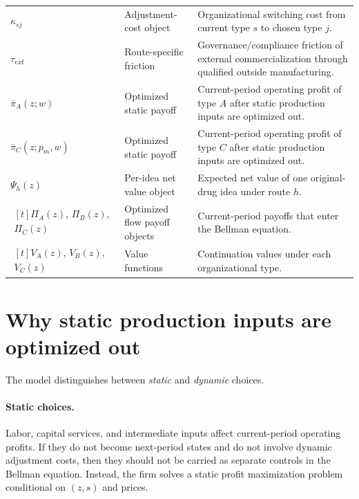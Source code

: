 \documentclass[12pt]{article}
\begin{document}
\begin{table}[htbp]
\begin{tabular}{@{}P{0.22\textwidth}P{0.20\textwidth}P{0.54\textwidth}@{}}
$\kappa_{sj}$ & Adjustment-cost object & Organizational switching cost from current type $s$ to chosen type $j$. \\[0.45em]

$\tau_{ext}$ & Route-specific friction & Governance/compliance friction of external commercialization through qualified outside manufacturing. \\[0.45em]

$\bar{\pi}_A(z;w)$ & Optimized static payoff & Current-period operating profit of type $A$ after static production inputs are optimized out. \\[0.45em]

$\bar{\pi}_C(z;p_m,w)$ & Optimized static payoff & Current-period operating profit of type $C$ after static production inputs are optimized out. \\[0.45em]

$\Psi_h(z)$ & Per-idea net value object & Expected net value of one original-drug idea under route $h$. \\[0.45em]

$\begin{aligned}[t]
\Pi_A(z),\,\Pi_B(z),\\
\Pi_C(z)
\end{aligned}$ & Optimized flow payoff objects & Current-period payoffs that enter the Bellman equation. \\[0.45em]

$\begin{aligned}[t]
V_A(z),\,V_B(z),\\
V_C(z)
\end{aligned}$ & Value functions & Continuation values under each organizational type. \\

\bottomrule
\end{tabular}
\end{table}

\section{Why static production inputs are optimized out}

The model distinguishes between \emph{static} and \emph{dynamic} choices.

\paragraph{Static choices.}
Labor, capital services, and intermediate inputs affect current-period operating profits.
If they do not become next-period states and do not involve dynamic adjustment costs, then
they should not be carried as separate controls in the Bellman equation. Instead, the firm
solves a static profit maximization problem conditional on $(z,s)$ and prices.
\end{document}
